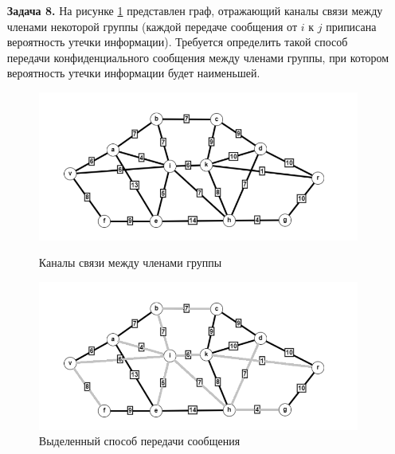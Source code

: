 \documentclass{article}
\begin{document}
\clearpage%
\begin{enumerate}
\item[\textbf{Задача 8.}] На рисунке \ref{fig:8_graph} представлен граф, отражающий каналы связи между членами некоторой группы (каждой передаче сообщения от $i$ к $j$ приписана вероятность утечки информации). Требуется определить такой способ передачи конфиденциального сообщения между членами группы, при котором вероятность утечки информации будет наименьшей.
\\
\begin{figure}[ht]
  \begin{minipage}[b]{0.5\textwidth}
    \centering
    \includegraphics[width=\textwidth, center]{attachments/8/0.png}
    \caption{Каналы связи между членами группы}
    \label{fig:8_graph}
  \end{minipage}
  \hfill
  \begin{minipage}[b]{.5\textwidth}
    \centering
    \includegraphics[width=\textwidth, center]{attachments/8/3.png}
        \caption{Выделенный способ передачи сообщения}

\end{minipage}
\end{figure}
\end{enumerate}
\end{document}
